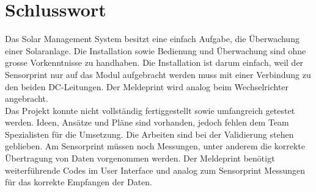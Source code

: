 \section{Schlusswort}
Das Solar Management System besitzt eine einfach Aufgabe, die Überwachung einer Solaranlage. Die Installation sowie Bedienung und Überwachung sind ohne grosse Vorkenntnisse zu handhaben. Die Installation ist darum einfach, weil der Sensorprint nur auf das Modul aufgebracht werden muss mit einer Verbindung zu den beiden DC-Leitungen. Der Meldeprint wird analog beim Wechselrichter angebracht.\\
Das Projekt konnte nicht vollständig fertiggestellt sowie umfangreich getestet werden. Ideen, Ansätze und Pläne sind vorhanden, jedoch fehlen dem Team Spezialisten für die Umsetzung. Die Arbeiten sind bei der Validierung stehen geblieben. Am Sensorprint müssen noch Messungen, unter anderem die korrekte Übertragung von Daten vorgenommen werden. Der Meldeprint benötigt weiterführende Codes im User Interface und analog zum Sensorprint Messungen für das korrekte Empfangen der Daten.